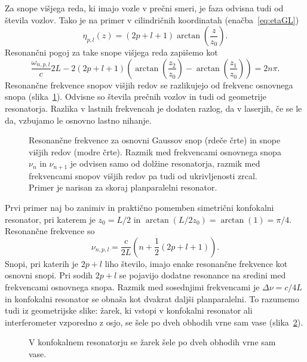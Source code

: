 Za snope višjega reda, ki imajo vozle v prečni smeri, je faza
odvisna tudi od števila vozlov. Tako je na primer v cilindričnih koordinatah
(enačba~\ref{eq:etaGL})
\begin{equation}
\eta_{p,l}(z)=(2p+l+1)\arctan\left(\frac{z}{z_{0}}\right)\!.
\end{equation}
Resonančni pogoj za take snope višjega reda zapišemo kot
\begin{equation}
\frac{\omega_{n,p,l}}{c}2L-2(2p+l+1)\left(\arctan\left(\frac{z_{2}}{z_{0}}\right)-
\arctan\left(\frac{z_{1}}{z_{0}}\right)\right)=2n\pi.
\end{equation}
Resonančne frekvence snopov višjih redov se razlikujejo od frekvenc
osnovnega snopa (slika~\ref{fig:crte}). Odvisne so števila prečnih vozlov
in tudi od geometrije resonatorja. 
Razlika v lastnih frekvencah je dodaten razlog, da v laserjih, če se le da,
vzbujamo le osnovno lastno nihanje.
\begin{figure}[ht]
\centering
\def\svgwidth{130truemm} 

\caption{Resonančne frekvence za osnovni Gaussov snop (rdeče črte) in snope višjih redov
(modre črte). Razmik med frekvencami osnovnega snopa $\nu_n$ in $\nu_{n+1}$ je odvisen 
samo od dolžine resonatorja, razmik med frekvencami snopov višjih redov pa tudi od 
ukrivljenosti zrcal. Primer je narisan za skoraj planparalelni resonator.}
\label{fig:crte}
\end{figure}

Prvi primer naj bo zanimiv in praktično pomemben simetrični konfokalni 
resonator, pri katerem je $z_{0}=L/2$ in 
$\arctan(L/2z_{0})= \arctan(1)=\pi/4$. Resonančne frekvence so 
\begin{equation}
\nu_{n,p,l}=\frac{c}{2L}\left(n+\frac{1}{2}(2p+l+1)\right)\!.
\label{eq:omega_konf}
\end{equation}
Snopi, pri katerih je $2p+l$ liho število, imajo enake resonančne frekvence kot
osnovni snopi. Pri sodih $2p+l$ se pojavijo dodatne resonance na sredini
med frekvencami osnovnega snopa. Razmik med so\-sed\-nji\-mi frekvencami 
je $\Delta\nu=c/4L$
in konfokalni resonator se obnaša kot dvakrat daljši planparalelni.
To razumemo tudi iz geometrijske slike: žarek, ki vstopi v konfokalni
resonator ali interferometer vzporedno z osjo, se šele po dveh obhodih vrne sam
vase (slika~\ref{fig:Konfokalni_zarek}).

\begin{figure}[ht]
\centering
\def\svgwidth{65truemm} 

\caption{V konfokalnem resonatorju se žarek šele po dveh obhodih
vrne sam vase.}
\label{fig:Konfokalni_zarek}
\end{figure}

